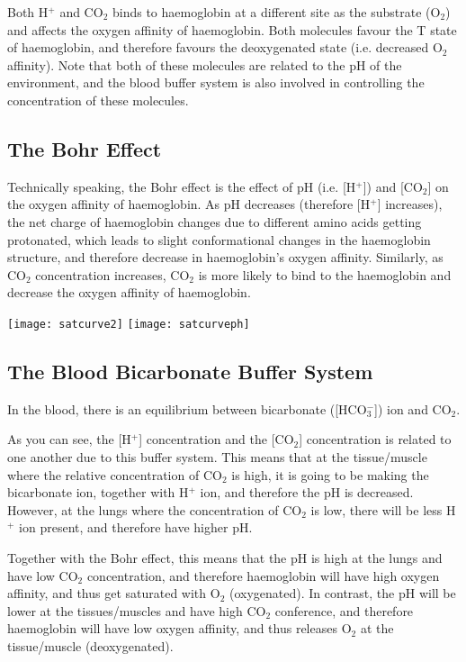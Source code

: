 Both H$^+$ and CO$_2$ binds to haemoglobin at a different site as the substrate (O$_2$) and affects the oxygen affinity of haemoglobin.
Both molecules favour the T state of haemoglobin, and therefore favours the deoxygenated state (i.e. decreased O$_2$ affinity).
Note that both of these molecules are related to the pH of the environment, and the blood buffer system is also involved in controlling the concentration of these molecules.

\subsection{The Bohr Effect}

Technically speaking, the Bohr effect is the effect of pH (i.e. [H$^+$]) and [CO$_2$] on the oxygen affinity of haemoglobin.
As pH decreases (therefore [H$^+$] increases), the net charge of haemoglobin changes due to different amino acids getting protonated, which leads to slight conformational changes in the haemoglobin structure, and therefore decrease in haemoglobin's oxygen affinity.
Similarly, as CO$_2$ concentration increases, CO$_2$ is more likely to bind to the haemoglobin and decrease the oxygen affinity of haemoglobin.

\begin{center}
\texttt{[image: satcurve2]}
\texttt{[image: satcurveph]}
\end{center}

\subsection{The Blood Bicarbonate Buffer System}

In the blood, there is an equilibrium between bicarbonate ([HCO$_3^-$]) ion and CO$_2$.

\begin{center}
\end{center}

As you can see, the [H$^+$] concentration and the [CO$_2$] concentration is related to one another due to this buffer system.
This means that at the tissue/muscle where the relative concentration of CO$_2$ is high, it is going to be making the bicarbonate ion, together with H$^+$ ion, and therefore the pH is decreased.
However, at the lungs where the concentration of CO$_2$ is low, there will be less H$^+$ ion present, and therefore have higher pH.

Together with the Bohr effect, this means that the pH is high at the lungs and have low CO$_2$ concentration, and therefore haemoglobin will have high oxygen affinity, and thus get saturated with O$_2$ (oxygenated).
In contrast, the pH will be lower at the tissues/muscles and have high CO$_2$ conference, and therefore haemoglobin will have low oxygen affinity, and thus releases O$_2$ at the tissue/muscle (deoxygenated).

